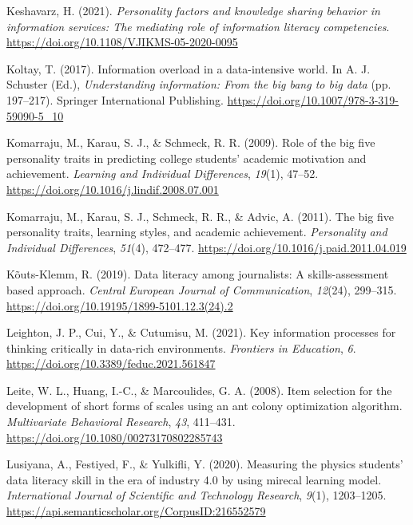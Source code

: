 \documentclass[
  12pt,
  a4paper,
  twoside]{article}
\newlength{\cslhangindent}
\newenvironment{CSLReferences}[2] %
 {\begin{list}{}{%
  \setlength{\itemindent}{0pt}
  \setlength{\leftmargin}{0pt}
  \setlength{\parsep}{0pt}
  \ifodd #1
   \setlength{\leftmargin}{\cslhangindent}
   \setlength{\itemindent}{-1\cslhangindent}
  \fi
  \setlength{\itemsep}{#2\baselineskip}}}
 {\end{list}}
\begin{document}
\begin{CSLReferences}{1}{0}
Keshavarz, H. (2021). \emph{Personality factors and knowledge sharing behavior in information services: The mediating role of information literacy competencies}. \url{https://doi.org/10.1108/VJIKMS-05-2020-0095}

Koltay, T. (2017). Information overload in a data-intensive world. In A. J. Schuster (Ed.), \emph{Understanding information: From the big bang to big data} (pp. 197--217). Springer International Publishing. \url{https://doi.org/10.1007/978-3-319-59090-5_10}

Komarraju, M., Karau, S. J., \& Schmeck, R. R. (2009). Role of the big five personality traits in predicting college students' academic motivation and achievement. \emph{Learning and Individual Differences}, \emph{19}(1), 47--52. \url{https://doi.org/10.1016/j.lindif.2008.07.001}

Komarraju, M., Karau, S. J., Schmeck, R. R., \& Advic, A. (2011). The big five personality traits, learning styles, and academic achievement. \emph{Personality and Individual Differences}, \emph{51}(4), 472--477. \url{https://doi.org/10.1016/j.paid.2011.04.019}

Kõuts-Klemm, R. (2019). Data literacy among journalists: A skills-assessment based approach. \emph{Central European Journal of Communication}, \emph{12}(24), 299--315. \url{https://doi.org/10.19195/1899-5101.12.3(24).2}

Leighton, J. P., Cui, Y., \& Cutumisu, M. (2021). Key information processes for thinking critically in data-rich environments. \emph{Frontiers in Education}, \emph{6}. \url{https://doi.org/10.3389/feduc.2021.561847}

Leite, W. L., Huang, I.-C., \& Marcoulides, G. A. (2008). Item selection for the development of short forms of scales using an ant colony optimization algorithm. \emph{Multivariate Behavioral Research}, \emph{43}, 411--431. \url{https://doi.org/10.1080/00273170802285743}

Lusiyana, A., Festiyed, F., \& Yulkifli, Y. (2020). Measuring the physics students' data literacy skill in the era of industry 4.0 by using mirecal learning model. \emph{International Journal of Scientific and Technology Research}, \emph{9}(1), 1203--1205. \url{https://api.semanticscholar.org/CorpusID:216552579}


\end{CSLReferences}
\end{document}
